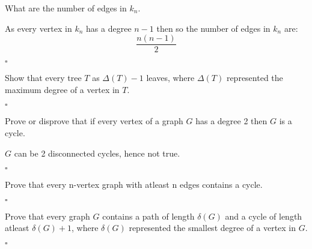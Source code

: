 \documentclass{exam}
\begin{document}
\begin{questions}
    \question What are the number of edges in $k_n$.
    \begin{solution}
        As every vertex in $k_n$ has a degree $n-1$ then so the number of edges in $k_n$ are:
        $$\frac{n(n-1)}{2}$$

        \begin{flushright}
            $\square$
        \end{flushright}
    \end{solution}

    \question Show that every tree $T$ as $\Delta(T)-1$ leaves, where $\Delta(T)$ represented the maximum degree of a vertex in $T$.
    \begin{solution}

        \begin{flushright}
            $\square$
        \end{flushright}
    \end{solution}

    \question Prove or disprove that if every vertex of a graph $G$ has a degree 2 then $G$ is a cycle.
    \begin{solution}
        $G$ can be 2 disconnected cycles, hence not true.
        \begin{flushright}
            $\square$
        \end{flushright}
    \end{solution}

    \question Prove that every n-vertex graph with atleast n edges contains a cycle.
    \begin{solution}

        \begin{flushright}
            $\square$
        \end{flushright}
    \end{solution}

    \question Prove that every graph $G$ contains a path of length $\delta(G)$ and a cycle of length atleast $\delta(G)+1$, where $\delta(G)$ represented the smallest degree of a vertex in $G$.

    \begin{solution}

        \begin{flushright}
            $\square$
        \end{flushright}
    \end{solution}

    
\end{questions}
\end{document}
